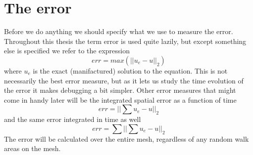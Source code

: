 \section{The error}
Before we do anything we should specify what we use to measure the error. 
Throughout this thesis the term error is used quite lazily, but except something else is specified we refer to the expression 
\begin{equation}
 err = max\left(||u_e-u||_2\right)
\end{equation}
where $u_e$ is the exact (manifactured) solution to the equation. 
This is not necessarily the best error measure, but as it lets us study the time evolution of the error it makes debugging a bit simpler. 
Other error measures that might come in handy later will be the integrated spatial error as a function of time
\begin{equation}
 err = ||\sum u_e-u||_2
\end{equation}
and the same error integrated in time as well
\begin{equation}
 err = \sum||\sum u_e-u||_2
\end{equation}
The error will be calculated over the entire mesh, regardless of any random walk areas on the mesh.

